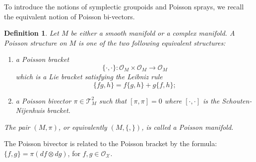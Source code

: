 \documentclass{amsart}
\newtheorem{definition}[theorem]{Definition}
\newcommand{\cO}{\mathcal{O}}
\newcommand{\cT}{\mathcal{T}}
\newcommand{\cX}{\mathcal{X}}
\begin{document}
To introduce the notions of symplectic groupoids and Poisson sprays, we recall the equivalent notion of Poisson bi-vectors.
\begin{definition}
  Let $M$ be either a smooth manifold or a complex manifold.
  A Poisson structure on $M$ is one of the two following equivalent structures:
  \begin{enumerate}
    \item a Poisson bracket
      \[\{\cdot, \cdot\}: \cO_M \times \cO_M \to \cO_M\]
      which is a Lie bracket satisfying the Leibniz rule
      \[\{fg, h\} = f\{g,h\} + g\{f,h\};\]
    \item a Poisson bivector $\pi \in \cT^2_M$ such that $[\pi, \pi] = 0$ where $[\cdot, \cdot]$ is the Schouten-Nijenhuis bracket.
  \end{enumerate}	
  The pair $(M, \pi)$, or equivalently $(M, \{,\})$, is called a Poisson manifold.
\end{definition}

The Poisson bivector is related to the Poisson bracket by the formula: $\{f, g\} = \pi (df \otimes dg)$, for $f, g\in \cO_\cX$.
\end{document}
